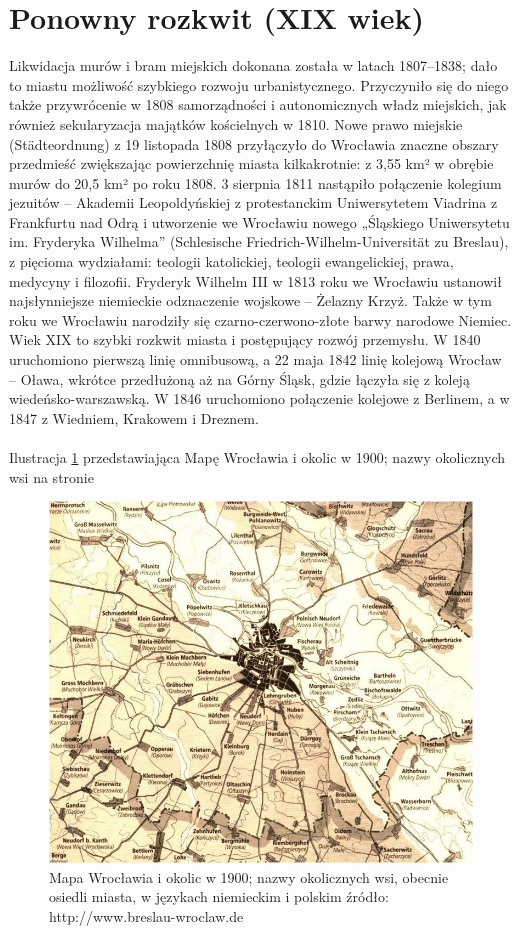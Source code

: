 \documentclass{article}
\begin{document}
\section{Ponowny rozkwit (XIX wiek)}
Likwidacja murów i bram miejskich dokonana została w latach 1807–1838; dało to miastu możliwość szybkiego rozwoju urbanistycznego. Przyczyniło się do niego także przywrócenie w 1808 samorządności i autonomicznych władz miejskich, jak również sekularyzacja majątków kościelnych w 1810. Nowe prawo miejskie (Städteordnung) z 19 listopada 1808 przyłączyło do Wrocławia znaczne obszary przedmieść zwiększając powierzchnię miasta kilkakrotnie: z 3,55 km² w obrębie murów do 20,5 km² po roku 1808. 3 sierpnia 1811 nastąpiło połączenie kolegium jezuitów – Akademii Leopoldyńskiej z protestanckim Uniwersytetem Viadrina z Frankfurtu nad Odrą i utworzenie we Wrocławiu nowego „Śląskiego Uniwersytetu im. Fryderyka Wilhelma” (Schlesische Friedrich-Wilhelm-Universität zu Breslau), z pięcioma wydziałami: teologii katolickiej, teologii ewangelickiej, prawa, medycyny i filozofii. Fryderyk Wilhelm III w 1813 roku we Wrocławiu ustanowił najsłynniejsze niemieckie odznaczenie wojskowe – Żelazny Krzyż. Także w tym roku we Wrocławiu narodziły się czarno-czerwono-złote barwy narodowe Niemiec. Wiek XIX to szybki rozkwit miasta i postępujący rozwój przemysłu. W 1840 uruchomiono pierwszą linię omnibusową, a 22 maja 1842 linię kolejową Wrocław – Oława, wkrótce przedłużoną aż na Górny Śląsk, gdzie łączyła się z koleją wiedeńsko-warszawską. W 1846 uruchomiono połączenie kolejowe z Berlinem, a w 1847 z Wiedniem, Krakowem i Dreznem.\\
\\
Ilustracja \ref{fig:mapawrociok} przedstawiająca Mapę Wrocławia i okolic w 1900;
nazwy okolicznych wsi na stronie \pageref{fig:mapawrociok}
\newpage
\begin{figure}[h!]
\centering
\includegraphics[scale=0.5]{773px-Ortsnamen_breslau_1900.jpg}
\caption{Mapa Wrocławia i okolic w 1900;
nazwy okolicznych wsi, obecnie osiedli miasta, w językach niemieckim i polskim
źródło: http://www.breslau-wroclaw.de}
\label{fig:mapawrociok}
\end{figure}
\end{document}
